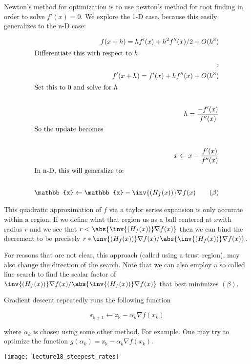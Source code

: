 \documentclass[../main.tex]{subfiles}
\begin{document}
\begin{definition}
    Newton's method for optimization is to use newton's method for root finding in order to solve $f'(x) = 0$. We explore the 1-D case, because this easily generalizes to the n-D case:

    \begin{align*}
        f(x + h) = hf'(x) + h^2 f''(x)/2 + O(h^3) \\
        \intertext{Differentiate this with respect to $h$}: \\
        f'(x + h) = f'(x) + h f''(x) + O(h^3) \\
        \intertext{Set this to $0$ and solve for $h$} \\
        h = \frac{-f'(x)}{f''(x)} \\
        \intertext{So the update becomes} \\
        x \leftarrow x - \frac{f'(x)}{f''(x)} \\
        \intertext{In n-D, this will generalize to:} \\
        \mathbb{x} \leftarrow \mathbb{x} - \inv{(H_f(x))}\nabla f(x) \tag{$\beta$}\\
    \end{align*}

    This quadratic approximation of $f$ via a taylor series expansion is only accurate within a region. If we define what that region us as a ball centered at $x$with radius $r$ and we see that $r < \abs{\inv{(H_f(x))}\nabla f(x)}$ then we can bind the decrement to be precisely $r * \inv{(H_f(x))}\nabla f(x)/\abs{\inv{(H_f(x))}\nabla f(x)}$.

    For reasons that are not clear, this approach (called using a trust region), may also change the direction of the search. Note that we can also employ a so called line search to find the scalar factor of $\inv{(H_f(x))}\nabla f(x)/\abs{\inv{(H_f(x))}\nabla f(x)}$ that best minimizes $(\beta)$.
\end{definition}


\begin{definition}
    Gradient descent repeatedly runs the following function

    \[
        \mathbb{x_{k+1}} \leftarrow \mathbb{x_{k}} - \alpha_k \nabla f(x_k)
    \]

    where $\alpha_k$ is chosen using some other method. For example. One may try to optimize the function $g(\alpha_k) = \mathbb{x_{k}} - \alpha_k \nabla f(x_k)$.

\begin{center}
    \texttt{[image: lecture18\_steepest\_rates]}
\end{center}
\end{definition}
\end{document}
